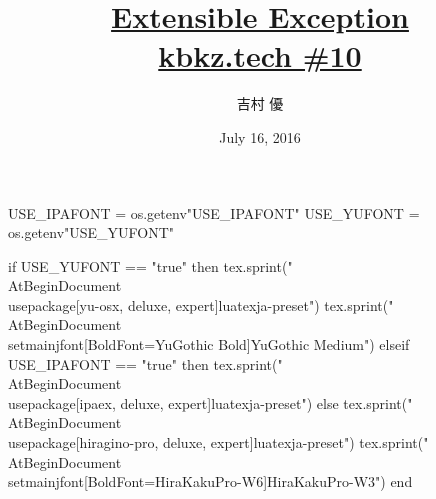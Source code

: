 \hypersetup{colorlinks,linkcolor=,urlcolor=links}

\beamertemplatenavigationsymbolsempty

\usepackage{luacode}
\usepackage{luatexja}
\usepackage{pgfpages}
\usepackage[osf]{mathpazo}

\begin{luacode*}
  USE_IPAFONT = os.getenv"USE_IPAFONT"
  USE_YUFONT = os.getenv"USE_YUFONT"
  
  if USE_YUFONT == "true" then
    tex.sprint("\\AtBeginDocument{\\usepackage[yu-osx, deluxe, expert]{luatexja-preset}}")
    tex.sprint("\\AtBeginDocument{\\setmainjfont[BoldFont=YuGothic Bold]{YuGothic Medium}}")
  elseif USE_IPAFONT == "true" then
    tex.sprint("\\AtBeginDocument{\\usepackage[ipaex, deluxe, expert]{luatexja-preset}}")
  else
    tex.sprint("\\AtBeginDocument{\\usepackage[hiragino-pro, deluxe, expert]{luatexja-preset}}")
    tex.sprint("\\AtBeginDocument{\\setmainjfont[BoldFont=HiraKakuPro-W6]{HiraKakuPro-W3}}")
  end
\end{luacode*}

\usepackage{epigraph}
\usepackage{etoolbox}
\usepackage{tikz}
\usepackage{framed}
\usepackage{libertine}
\usepackage[final]{listings}
\usepackage{amsmath}
\usepackage{mathtools}
\usepackage{tikz-qtree}



\setmainfont[Numbers=OldStyle, BoldFont=Palatino Bold]{Palatino}
\setsansfont{CMU Sans Serif}
\setmonofont{CMU Typewriter Text}

\title[Extensible Exception]{%
  \href{https://github.com/y-yu/extensible-exception-slide}{Extensible Exception} \\
  \href{http://kbkz.connpass.com/event/32420/}{\normalsize kbkz.tech \#10}
}
\author{吉村 優}
\date{July 16, 2016}

